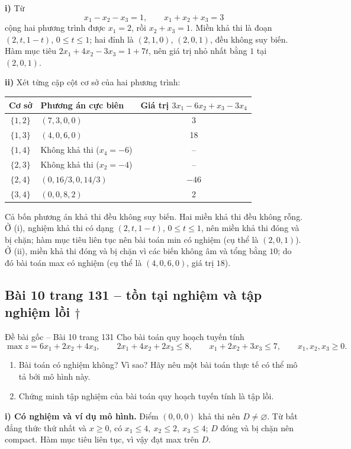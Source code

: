 \documentclass[11pt,a4paper]{article}
\begin{document}
\textbf{i)} Từ
\[
x_1-x_2-x_3=1,\qquad x_1+x_2+x_3=3
\]
cộng hai phương trình được \(x_1=2\), rồi \(x_2+x_3=1\). Miền khả thi là đoạn \((2,t,1-t)\), \(0\le t\le1\); hai đỉnh là \((2,1,0)\), \((2,0,1)\), đều không suy biến. Hàm mục tiêu \(2x_1+4x_2-3x_3=1+7t\), nên giá trị nhỏ nhất bằng \(1\) tại \((2,0,1)\).

\textbf{ii)} Xét từng cặp cột cơ sở của hai phương trình:
\begin{center}
\begin{tabularx}{.95\textwidth}{c Y c}
\toprule
Cơ sở & Phương án cực biên & Giá trị \(3x_1-6x_2+x_3-3x_4\)\\
\midrule
\(\{1,2\}\) & \((7,3,0,0)\) & 3\\
\(\{1,3\}\) & \((4,0,6,0)\) & 18\\
\(\{1,4\}\) & Không khả thi (\(x_4=-6\)) & --\\
\(\{2,3\}\) & Không khả thi (\(x_2=-4\)) & --\\
\(\{2,4\}\) & \((0,16/3,0,14/3)\) & \(-46\)\\
\(\{3,4\}\) & \((0,0,8,2)\) & 2\\
\bottomrule
\end{tabularx}
\end{center}
Cả bốn phương án khả thi đều không suy biến. Hai miền khả thi đều không rỗng. Ở (i), nghiệm khả thi có dạng \((2,t,1-t)\), \(0\le t\le1\), nên miền khả thi đóng và bị chặn; hàm mục tiêu liên tục nên bài toán min có nghiệm (cụ thể là \((2,0,1)\)). Ở (ii), miền khả thi đóng và bị chặn vì các biến không âm và tổng bằng \(10\); do đó bài toán max có nghiệm (cụ thể là \((4,0,6,0)\), giá trị \(18\)).

\subsection{Bài 10 trang 131 -- tồn tại nghiệm và tập nghiệm lồi \(\dagger\)}
\begin{questionbox}{Đề bài gốc -- Bài 10 trang 131}
Cho bài toán quy hoạch tuyến tính
\[
\max z=6x_1+2x_2+4x_3,\qquad
2x_1+4x_2+2x_3\le8,\qquad
x_1+2x_2+3x_3\le7,\qquad x_1,x_2,x_3\ge0.
\]
\begin{enumerate}[label=\roman*),nosep,leftmargin=*]
\item Bài toán có nghiệm không? Vì sao? Hãy nêu một bài toán thực tế có thể mô tả bởi mô hình này.
\item Chứng minh tập nghiệm của bài toán quy hoạch tuyến tính là tập lồi.
\end{enumerate}
\end{questionbox}
\textbf{i) Có nghiệm và ví dụ mô hình.} Điểm \((0,0,0)\) khả thi nên \(D\ne\varnothing\). Từ bất đẳng thức thứ nhất và \(x\ge0\), có \(x_1\le4,\ x_2\le2,\ x_3\le4\); \(D\) đóng và bị chặn nên compact. Hàm mục tiêu liên tục, vì vậy đạt max trên \(D\).
\end{document}
